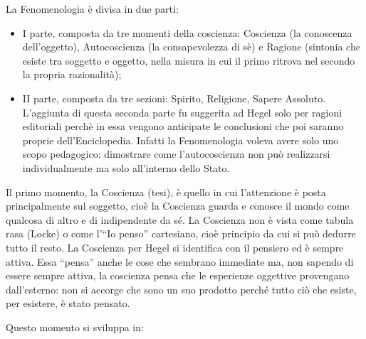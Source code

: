 \documentclass[a4paper,12pt,oneside,openany]{book}%
\begin{document}
La Fenomenologia è divisa in due parti:

\begin{itemize}
	\item I parte, composta da tre momenti della coscienza: Coscienza (la conoscenza dell’oggetto), Autocoscienza (la consapevolezza di sè) e Ragione (sintonia che esiste tra soggetto e oggetto, nella misura in cui il primo ritrova nel secondo la propria razionalità);
	\item II parte, composta da tre sezioni: Spirito, Religione, Sapere Assoluto. L’aggiunta di questa seconda parte fu suggerita ad Hegel solo per ragioni editoriali perchè in essa vengono anticipate le conclusioni che poi saranno proprie dell’Enciclopedia. Infatti la Fenomenologia voleva avere solo uno scopo pedagogico: dimostrare come l’autocoscienza non può realizzarsi individualmente ma solo all’interno dello Stato.
\end{itemize}

Il primo momento, la Coscienza (tesi), è quello in cui l’attenzione è posta principalmente sul soggetto, cioè la Coscienza guarda e conosce il mondo come qualcosa di altro e di indipendente da sé. La Coscienza non è vista come tabula rasa (Locke) o come l’“Io penso” cartesiano, cioè principio da cui si può dedurre tutto il resto. La Coscienza per Hegel si identifica con il pensiero ed è sempre attiva. Essa “pensa” anche le cose che sembrano immediate ma, non sapendo di essere sempre attiva, la coscienza pensa che le esperienze oggettive provengano dall’esterno: non si accorge che sono un suo prodotto perché tutto ciò che esiste, per esistere, è stato pensato.

Questo momento si sviluppa in:
\end{document}

